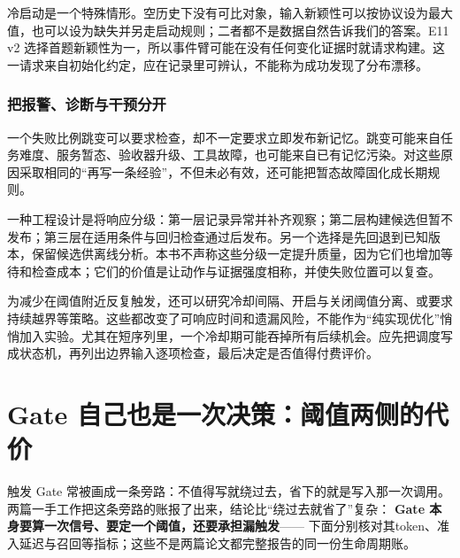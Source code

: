 冷启动是一个特殊情形。空历史下没有可比对象，输入新颖性可以按协议设为最大值，也可以设为缺失并另走启动规则；二者都不是数据自然告诉我们的答案。E11 v2 选择首题新颖性为一，所以事件臂可能在没有任何变化证据时就请求构建。这一请求来自初始化约定，应在记录里可辨认，不能称为成功发现了分布漂移。

\subsubsection{把报警、诊断与干预分开}

一个失败比例跳变可以要求检查，却不一定要求立即发布新记忆。跳变可能来自任务难度、服务暂态、验收器升级、工具故障，也可能来自已有记忆污染。对这些原因采取相同的“再写一条经验”，不但未必有效，还可能把暂态故障固化成长期规则。

一种工程设计是将响应分级：第一层记录异常并补齐观察；第二层构建候选但暂不发布；第三层在适用条件与回归检查通过后发布。另一个选择是先回退到已知版本，保留候选供离线分析。本书不声称这些分级一定提升质量，因为它们也增加等待和检查成本；它们的价值是让动作与证据强度相称，并使失败位置可以复查。

为减少在阈值附近反复触发，还可以研究冷却间隔、开启与关闭阈值分离、或要求持续越界等策略。这些都改变了可响应时间和遗漏风险，不能作为“纯实现优化”悄悄加入实验。尤其在短序列里，一个冷却期可能吞掉所有后续机会。应先把调度写成状态机，再列出边界输入逐项检查，最后决定是否值得付费评价。

\section{Gate 自己也是一次决策：阈值两侧的代价}
\label{sec:ch13-gate}

\begin{sloppypar}
触发 Gate 常被画成一条旁路：不值得写就绕过去，省下的就是写入那一次调用。
两篇一手工作把这条旁路的账报了出来，结论比“绕过去就省了”复杂：
\textbf{Gate 本身要算一次信号、要定一个阈值，还要承担漏触发}——
下面分别核对其token、准入延迟与召回等指标；这些不是两篇论文都完整报告的同一份生命周期账。
\end{sloppypar}

